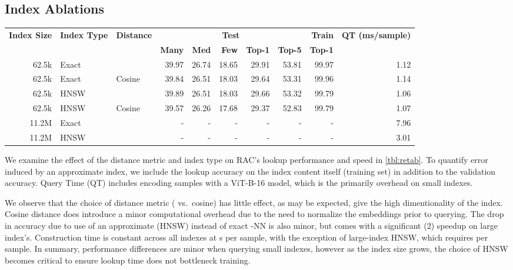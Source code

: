 \documentclass[10pt,twocolumn,letterpaper]{article}
\begin{document}
{\subsection{Index Ablations}
\begin{table*}
\centering
\begin{tabular}{@{}rllrrrrrrr@{}}
\toprule
\multirow{2}{*}{\textbf{Index Size}} &
  \multicolumn{1}{c}{\multirow{2}{*}{\textbf{Index Type}}} &
  \multicolumn{1}{c}{\multirow{2}{*}{\textbf{Distance}}} &
  \multicolumn{5}{c}{\textbf{Test}} &
  \textbf{Train} &
  \multirow{2}{*}{\textbf{QT (ms/sample)}} \\
 &
  \multicolumn{1}{c}{} &
  \multicolumn{1}{c}{} &
  \textbf{Many} &
  \textbf{Med} &
  \textbf{Few} &
  \textbf{Top-1} &
  \textbf{Top-5} &
  \textbf{Top-1} &
   \\ \midrule
62.5k & Exact &      & 39.97 & 26.74 & 18.65 & 29.91 & 53.81 & 99.97 & 1.12 \\
62.5k & Exact & Cosine & 39.84 & 26.51 & 18.03 & 29.64 & 53.31 & 99.96 & 1.14 \\
62.5k & HNSW  &      & 39.89 & 26.51 & 18.03 & 29.66 & 53.32 & 99.79 & 1.06 \\
62.5k & HNSW  & Cosine & 39.57 & 26.26 & 17.68 & 29.37 & 52.83 & 99.79 & 1.07 \\
11.2M & Exact &      & -     & -     & -     & -     & -     & -     & 7.96 \\
11.2M & HNSW  &      & -     & -     & -     & -     & -     & -     & 3.01 \\ \bottomrule
\end{tabular}
\caption{Index ablations on Places365-LT. QT indicates Query Time. Large-sample indices are filled with the ImageNet21k dataset. }
\label{tbl:retab}
\end{table*}

We examine the effect of the distance metric and index type on RAC's lookup performance and speed in \cref{tbl:retab}. To quantify error induced by an approximate index, we include the lookup accuracy on the index content itself (training set) in addition to the validation accuracy. Query Time (QT) includes encoding samples with a ViT-B-16 model, which is the primarily overhead on small indexes.

We observe that the choice of distance metric ( vs.\  cosine) has little effect, as may be expected, give the high dimentionality of the index. Cosine distance does introduce a minor computational overhead due to the need to normalize the embeddings prior to querying. The drop in accuracy due to use of an approximate (HNSW) instead of exact -NN is also minor, but comes with a significant (2) speedup on large index's. Construction time is constant across all indexes at s per sample, with the exception of large-index HNSW, which requires  per sample. In summary, performance differences are minor when querying small indexes, however as the index size grows, the choice of HNSW becomes critical to ensure lookup time does not bottleneck training.









}
\end{document}
